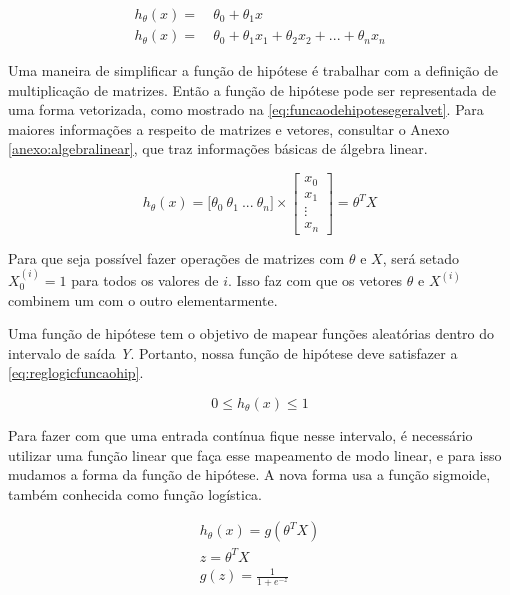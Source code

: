 \begin{align}
h_{\theta}(x) = &\ \theta_0 + \theta_1 x \label{eq:funcaodehipotese} \\
h_{\theta}(x) = &\ \theta_0 + \theta_1 x_1 + \theta_2 x_2 + ... + \theta_n x_n \label{eq:funcaodehipotesegeral}
\end{align}

Uma maneira de simplificar a função de hipótese é trabalhar com a definição de multiplicação de matrizes. Então a função de hipótese pode ser representada de uma forma vetorizada, como mostrado na \autoref{eq:funcaodehipotesegeralvet}. Para maiores informações a respeito de matrizes e vetores, consultar o Anexo \ref{anexo:algebralinear}, que traz informações básicas de álgebra linear.

\begin{equation}
h_{\theta}(x) = \big[\theta_0\ \theta_1\ ...\ \theta_n\big] \times \begin{bmatrix} x_0 \\ x_1 \\ \vdots \\ x_n \end{bmatrix}  = \theta^TX \label{eq:funcaodehipotesegeralvet}
\end{equation}

Para que seja possível fazer operações de matrizes com $\theta$ e $X$, será setado $X_0^{(i)} = 1$ para todos os valores de $i$. Isso faz com que os vetores $\theta$ e $X^{(i)}$ combinem um com o outro elementarmente.

Uma função de hipótese tem o objetivo de mapear funções aleatórias dentro do intervalo de saída \textit{Y}. Portanto, nossa função de hipótese deve satisfazer a \autoref{eq:reglogicfuncaohip}.

\begin{equation}\label{eq:reglogicfuncaohip}
0 \leq h_{\theta}(x) \leq 1
\end{equation}

Para fazer com que uma entrada contínua fique nesse intervalo, é necessário utilizar uma função linear que faça esse mapeamento de modo linear, e para isso mudamos a forma da função de hipótese. A nova forma usa a função sigmoide, também conhecida como função logística.

\begin{align}
h_{\theta}(x) = g(\theta^TX) \nonumber \\
z = \theta^TX \nonumber \\
g(z) = \frac{1}{1 + e^{-z}} \label{eq:funcaosigmoide}
\end{align}

